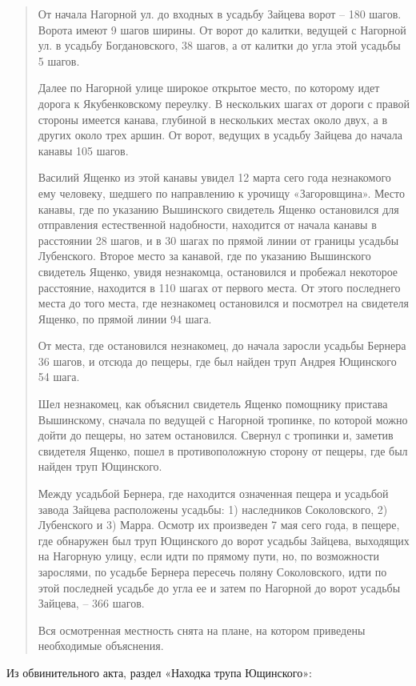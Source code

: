 \begin{quotation}
От начала Нагорной ул. до входных в усадьбу Зайцева ворот – 180 шагов. Ворота имеют 9 шагов ширины. От ворот до калитки, ведущей с Нагорной ул. в усадьбу Богдановского, 38 шагов, а от калитки до угла этой усадьбы 5 шагов.

Далее по Нагорной улице широкое открытое место, по которому идет дорога к Якубенковскому переулку. В нескольких шагах от дороги с правой стороны имеется канава, глубиной в нескольких местах около двух, а в других около трех аршин. От ворот, ведущих в усадьбу Зайцева до начала канавы 105 шагов.

Василий Ященко из этой канавы увидел 12 марта сего года незнакомого ему человеку, шедшего по направлению к урочищу «Загоровщина». Место канавы, где по указанию Вышинского свидетель Ященко остановился для отправления естественной надобности, находится от начала канавы в расстоянии 28 шагов, и в 30 шагах по прямой линии от границы усадьбы Лубенского. Второе место за канавой, где по указанию Вышинского свидетель Ященко, увидя незнакомца, остановился и пробежал некоторое расстояние, находится в 110 шагах от первого места. От этого последнего места до того места, где незнакомец остановился и посмотрел на свидетеля Ященко, по прямой линии 94 шага.

От места, где остановился незнакомец, до начала заросли усадьбы Бернера 36 шагов, и отсюда до пещеры, где был найден труп Андрея Ющинского 54 шага.

Шел незнакомец, как объяснил свидетель Ященко помощнику пристава Вышинскому, сначала по ведущей с Нагорной тропинке, по которой можно дойти до пещеры, но затем остановился. Свернул с тропинки и, заметив свидетеля Ященко, пошел в противоположную сторону от пещеры, где был найден труп Ющинского.

Между усадьбой Бернера, где находится оз\-наченная пещера и усадьбой завода Зайцева расположены усадьбы: 1) наследников Соколовского, 2) Лубенского и 3) Марра. Осмотр их произведен 7 мая сего года, в пещере, где обнаружен был труп Ющинского до ворот усадьбы Зайцева, выходящих на Нагорную улицу, если идти по прямому пути, но, по возможности зарослями, по усадьбе Бернера пересечь поляну Соколовского, идти по этой последней усадьбе до угла ее и затем по Нагорной до ворот усадьбы Зайцева, – 366 шагов. 

Вся осмотренная местность снята на плане, на котором приведены необходимые объяснения.
\end{quotation} 

Из обвинительного акта, раздел «Находка трупа Ющ\-инского»:

